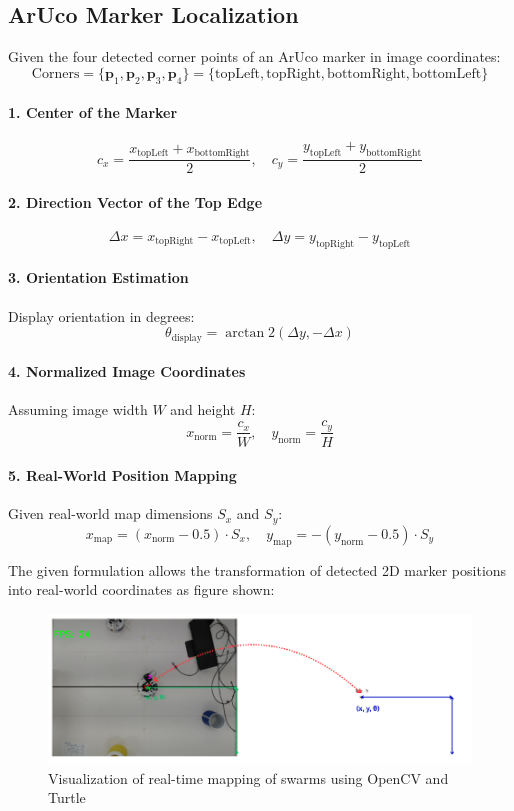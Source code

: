 \subsection*{ArUco Marker Localization}

Given the four detected corner points of an ArUco marker in image coordinates:
\[
\text{Corners} = \{ \mathbf{p}_1, \mathbf{p}_2, \mathbf{p}_3, \mathbf{p}_4 \} = \{ \text{topLeft}, \text{topRight}, \text{bottomRight}, \text{bottomLeft} \}
\]

\paragraph*{1. Center of the Marker}
\[
c_x = \frac{x_{\text{topLeft}} + x_{\text{bottomRight}}}{2}, \quad
c_y = \frac{y_{\text{topLeft}} + y_{\text{bottomRight}}}{2}
\]

\paragraph*{2. Direction Vector of the Top Edge}
\[
\Delta x = x_{\text{topRight}} - x_{\text{topLeft}}, \quad
\Delta y = y_{\text{topRight}} - y_{\text{topLeft}}
\]

\paragraph*{3. Orientation Estimation}
Display orientation in degrees:
\[
\theta_{\text{display}} = \arctan2(\Delta y, -\Delta x)
\]

\paragraph*{4. Normalized Image Coordinates}
Assuming image width $W$ and height $H$:
\[
x_{\text{norm}} = \frac{c_x}{W}, \quad
y_{\text{norm}} = \frac{c_y}{H}
\]

\paragraph*{5. Real-World Position Mapping}
Given real-world map dimensions $S_x$ and $S_y$:
\[
x_{\text{map}} = (x_{\text{norm}} - 0.5) \cdot S_x, \quad
y_{\text{map}} = -(y_{\text{norm}} - 0.5) \cdot S_y
\]

The given formulation allows the transformation of detected 2D marker positions into real-world coordinates as figure shown:

\begin{figure}[H]
    \centering
    \includegraphics[width=1\linewidth]{assets/images/odometry/mapping.png}
    \caption{Visualization of real-time mapping of swarms using OpenCV and Turtle}
    \label{fig:coor-mapping}
\end{figure}

